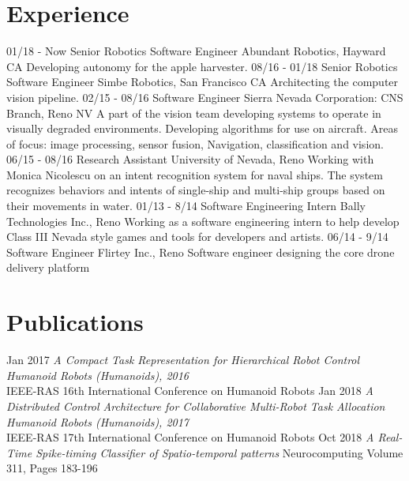 \documentclass[]{friggeri-cv}
\begin{document}
\section{Experience}
\begin{entrylist}
  \entry
    {01/18 - Now}
    {Senior Robotics Software Engineer}
    {Abundant Robotics, Hayward CA}
    {Developing autonomy for the apple harvester.}
  \entry
    {08/16 - 01/18}
    {Senior Robotics Software Engineer}
    {Simbe Robotics, San Francisco CA}
    {Architecting the computer vision pipeline.}
  \entry
    {02/15 - 08/16}
    {Software Engineer}
    {Sierra Nevada Corporation: CNS Branch, Reno NV}
    {A part of the vision team developing systems to operate in visually degraded environments. Developing algorithms for use on aircraft. Areas of focus: image processing, sensor fusion, Navigation, classification and vision.}
  \entry
    {06/15 - 08/16}
    {Research Assistant}
    {University of Nevada, Reno}
    {Working with Monica Nicolescu on an intent recognition system for naval ships. The system recognizes behaviors and intents of single-ship and multi-ship groups based on their movements in water.}
  \entry
    {01/13 - 8/14}
    {Software Engineering Intern}
    {Bally Technologies Inc., Reno}
    {Working as a software engineering intern to help develop Class III Nevada style games and tools for developers and artists.}
  \entry
    {06/14 - 9/14}
    {Software Engineer}
    {Flirtey Inc., Reno}
    {Software engineer designing the core drone delivery platform}
\end{entrylist}

\section{Publications}
\begin{entrylist}
  \entry
    {Jan 2017}
    {\emph{A Compact Task Representation for Hierarchical Robot Control}}
    {}
    {\emph{Humanoid Robots (Humanoids), 2016}\\IEEE-RAS 16th International Conference on Humanoid Robots}
  \entry
    {Jan 2018}
    {\emph{A Distributed Control Architecture for Collaborative Multi-Robot Task Allocation}}
    {}
    {\emph{Humanoid Robots (Humanoids), 2017}\\IEEE-RAS 17th International Conference on Humanoid Robots}
  \entry
    {Oct 2018}
    {\emph{A Real-Time Spike-timing Classifier of Spatio-temporal patterns}}
    {}
    {Neurocomputing Volume 311, Pages 183-196}
\end{entrylist}
\end{document}
